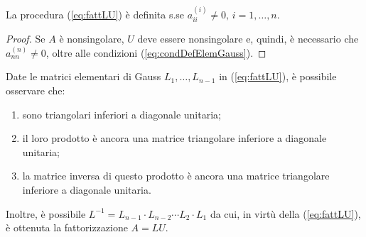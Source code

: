 \begin{theorem}\label{th:condDefFattLU}
    La procedura (\ref{eq:fattLU}) è definita s.se $a_{ii}^{(i)}\neq 0,\, i=1,\hdots, n.$
\end{theorem}
\begin{proof}
    Se $A$ è \gls{nonsingolare}, $U$ deve essere \gls{nonsingolare} e, quindi, è necessario che $a_{nn}^{(n)}\neq 0$, oltre alle condizioni (\ref{eq:condDefElemGauss}).
\end{proof}

\begin{remark}
    Date le matrici elementari di Gauss $L_1, \hdots, L_{n-1}$ in (\ref{eq:fattLU}), è possibile osservare che:
\begin{enumerate}
    \item sono triangolari inferiori a diagonale unitaria;
    \item il loro prodotto è ancora una matrice triangolare inferiore a diagonale unitaria;
    \item la matrice inversa di questo prodotto è ancora una matrice triangolare inferiore a diagonale unitaria.
\end{enumerate}
Inoltre, è possibile $L^{-1}=L_{n-1}\cdot L_{n-2}\cdots L_2\cdot L_1$ da cui, in virtù della (\ref{eq:fattLU}), è ottenuta la fattorizzazione $A=LU$.
\end{remark}

